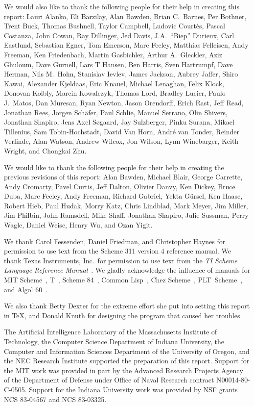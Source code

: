 We would also like to thank the following people for their
help in creating this report: Lauri Alanko,
Eli Barzilay, Alan Bawden, Brian C.\ Barnes, Per Bothner, Trent Buck,
Thomas Bushnell, Taylor Campbell, Ludovic Court\`es, Pascal Costanza,
John Cowan, Ray Dillinger, Jed Davis, J.A.\ ``Biep'' Durieux, Carl Eastlund,
Sebastian Egner, Tom Emerson, Marc Feeley, Matthias Felleisen, Andy
Freeman, Ken Friedenbach, Martin Gasbichler, Arthur A.\ Gleckler, Aziz
Ghuloum, Dave Gurnell, Lars T Hansen, Ben Harris, Sven Hartrumpf, Dave
Herman, Nils M.\ Holm, Stanislav Ievlev, James Jackson, Aubrey Jaffer,
Shiro Kawai, Alexander Kjeldaas, Eric Knauel, Michael Lenaghan, Felix Klock,
Donovan Kolbly, Marcin Kowalczyk, Thomas Lord, Bradley Lucier, Paulo
J.\ Matos, Dan Muresan, Ryan Newton, Jason Orendorff, Erich Rast, Jeff
Read, Jonathan Rees, Jorgen Sch\"afer, Paul Schlie, Manuel Serrano,
Olin Shivers, Jonathan Shapiro, Jens Axel S\o{}gaard, Jay Sulzberger,
Pinku Surana, Mikael Tillenius, Sam Tobin-Hochstadt, David Van Horn,
Andr\'e van Tonder, Reinder Verlinde, Alan Watson, Andrew Wilcox, Jon
Wilson, Lynn Winebarger, Keith Wright, and Chongkai Zhu.

We would like to thank the following people for their help in creating
the previous revisions of this report: Alan Bawden, Michael
Blair, George Carrette, Andy Cromarty, Pavel Curtis, Jeff Dalton, Olivier Danvy,
Ken Dickey, Bruce Duba, Marc Feeley,
Andy Freeman, Richard Gabriel, Yekta G\"ursel, Ken Haase, Robert
Hieb, Paul Hudak, Morry Katz, Chris Lindblad, Mark Meyer, Jim Miller, Jim Philbin,
John Ramsdell, Mike Shaff, Jonathan Shapiro, Julie Sussman,
Perry Wagle, Daniel Weise, Henry Wu, and Ozan Yigit.

We thank Carol Fessenden, Daniel
Friedman, and Christopher Haynes for permission to use text from the Scheme 311
version 4 reference manual.  We thank Texas Instruments, Inc.~for permission to
use text from the {\em TI Scheme Language Reference Manual}~\cite{TImanual85}.
We gladly acknowledge the influence of manuals for MIT Scheme~\cite{MITScheme},
T~\cite{Rees84}, Scheme 84~\cite{Scheme84}, Common Lisp~\cite{CLtL},
Chez Scheme~\cite{csug7}, PLT~Scheme~\cite{mzscheme352},
and Algol 60~\cite{Naur63}.

\vest We also thank Betty Dexter for the extreme effort she put into
setting this report in \TeX, and Donald Knuth for designing the program
that caused her troubles.

\vest The Artificial Intelligence Laboratory of the
Massachusetts Institute of Technology, the Computer Science
Department of Indiana University, the Computer and Information
Sciences Department of the University of Oregon, and the NEC Research
Institute supported the preparation of this report.  Support for the MIT
work was provided in part by
the Advanced Research Projects Agency of the Department of Defense under Office
of Naval Research contract N00014-80-C-0505.  Support for the Indiana
University work was provided by NSF grants NCS 83-04567 and NCS
83-03325.


